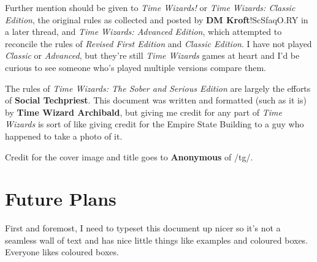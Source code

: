 \documentclass{article}
\newcommand{\twsse}{\emph{Time Wizards: The Sober and Serious Edition}}
\newcommand{\tw}{\emph{Time Wizards}}
\newcommand{\rfe}{\emph{Revised First Edition}}
\newcommand{\anon}[1][]{{\color{anongreen} \textbf{Anonymous}#1}}
\newcommand{\namefag}[2][]{{\color{anongreen} \textbf{#2}#1}}
\begin{document}
Further mention should be given to \emph{Time Wizards!} or \emph{Time Wizards: Classic Edition},
the original rules as collected and posted by \namefag[!ScSfaqO.RY]{DM Kroft} in a later thread,
and \emph{Time Wizards: Advanced Edition}, which attempted to reconcile the rules of \rfe{} and
\emph{Classic Edition}. I have not played \emph{Classic} or \emph{Advanced}, but they're still
\tw{} games at heart and I'd be curious to see someone who's played multiple versions compare
them.

The rules of \twsse{} are largely the efforts of \namefag{Social Techpriest}. This document was
written and formatted (such as it is) by \namefag{Time Wizard Archibald}, but giving me credit
for any part of \tw{} is sort of like giving credit for the Empire State Building to a guy who
happened to take a photo of it.

Credit for the cover image and title goes to \anon{} of /tg/.

\section{Future Plans}
First and foremost, I need to typeset this document up nicer so it's not a seamless wall of text
and has nice little things like examples and coloured boxes. Everyone likes coloured boxes.
\end{document}
